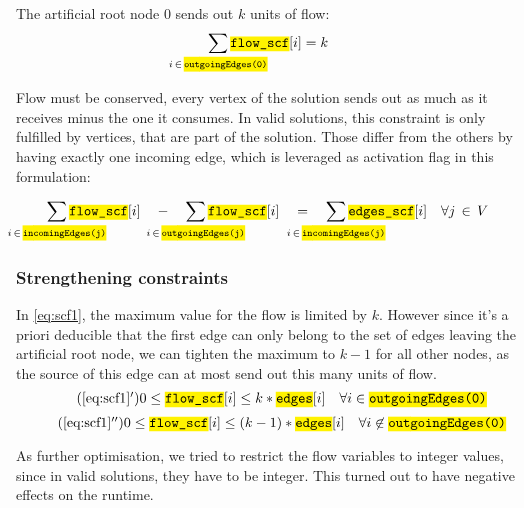\documentclass[,%
			paper=a4,%
			DIV14,
			liststotoc,
			bibtotoc,
			draft=false,%
			numbers=noendperiod
			]{scrartcl}
\newcommand{\ilc}[1]{\hl{\texttt{#1}}} %
\begin{document}
The artificial root node $0$ sends out $k$ units of flow:\nolinebreak
\begin{equation}
	\sum_{\mathclap{i\,\in\,\ilc{outgoingEdges(0)}}} \ilc{flow\_scf}[i] = k
\end{equation}

Flow must be conserved, every vertex of the solution sends out as much as it receives minus the one it consumes. In valid solutions, this constraint is only fulfilled by vertices, that are part of the solution. Those differ from the others by having exactly one incoming edge, which is leveraged as activation flag in this formulation:

\begin{equation}
	\sum_{\mathclap{i\,\in\,\ilc{incomingEdges(j)}}} \ilc{flow\_scf}[i] \quad - \quad
	\sum_{\mathclap{i\,\in\,\ilc{outgoingEdges(j)}}} \ilc{flow\_scf}[i] \quad = \quad 
	\sum_{\mathclap{i\,\in\,\ilc{incomingEdges(j)}}} \ilc{edges\_scf}[i] 
	\quad \forall j\,\in\,V
\end{equation}


\subsubsection{Strengthening constraints}

In \eqref{eq:scf1}, the maximum value for the flow is limited by $k$. However since it's a priori deducible that the first edge can only belong to the set of edges leaving the artificial root node, we can tighten the maximum to $k-1$ for all other nodes, as the source of this edge can at most send out this many units of flow.
\begin{equation}\tag{\ref{eq:scf1}$^\prime$}
	0 \leq \ilc{flow\_scf}[i] \leq k * \ilc{edges}[i] \quad \forall i \in \ilc{outgoingEdges(0)} 
\end{equation}
\begin{equation}\tag{\ref{eq:scf1}$^{\prime\prime}$}
	0 \leq \ilc{flow\_scf}[i] \leq (k-1) * \ilc{edges}[i] \quad \forall i \not\in \ilc{outgoingEdges(0)}
\end{equation}

As further optimisation, we tried to restrict the flow variables to integer values, since in valid solutions, they have to be integer. This turned out to have negative effects on the runtime.


\begin{comment}
	- flow on each edge
	- 0 <= flow\_i <= k/k-1 * edge
	- root note emits
	- every node eats/flow conservation
\end{comment}
\end{document}
